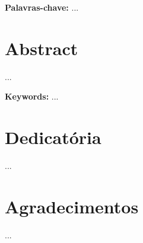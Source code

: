 \documentclass[12pt,a4paper,openright,oneside]{memoir}
\begin{document}
\bigskip

\textbf{Palavras-chave:} ...

\chapter*{Abstract}
\noindent
...

\bigskip

\textbf{Keywords:} ...

\chapter*{Dedicatória}
\begin{flushright}
    ...
\end{flushright}

\chapter*{Agradecimentos}
...

\clearpage
\tableofcontents
\clearpage
\listoffigures
\clearpage
\listoftables
\clearpage

\end{document}
